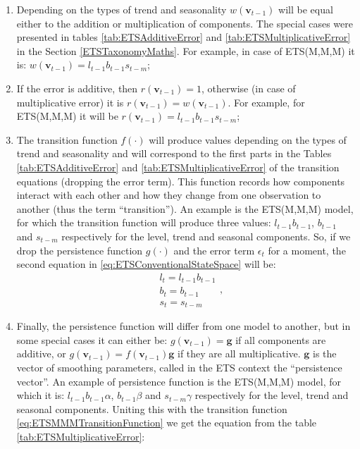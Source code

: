 \documentclass[]{book}
\providecommand{\tightlist}{%
  \setlength{\itemsep}{0pt}\setlength{\parskip}{0pt}}
\theoremstyle{definition}
\theoremstyle{definition}
\theoremstyle{definition}
\theoremstyle{definition}
\theoremstyle{remark}
\begin{document}
\begin{enumerate}
\def\labelenumi{\arabic{enumi}.}
\tightlist
\item
  Depending on the types of trend and seasonality \(w(\mathbf{v}_{t-1})\) will be equal either to the addition or multiplication of components. The special cases were presented in tables \ref{tab:ETSAdditiveError} and \ref{tab:ETSMultiplicativeError} in the Section \ref{ETSTaxonomyMaths}. For example, in case of ETS(M,M,M) it is: \(w(\mathbf{v}_{t-1}) = l_{t-1} b_{t-1} s_{t-m}\);
\item
  If the error is additive, then \(r(\mathbf{v}_{t-1})=1\), otherwise (in case of multiplicative error) it is \(r(\mathbf{v}_{t-1})=w(\mathbf{v}_{t-1})\). For example, for ETS(M,M,M) it will be \(r(\mathbf{v}_{t-1}) = l_{t-1} b_{t-1} s_{t-m}\);
\item
  The transition function \(f(\cdot)\) will produce values depending on the types of trend and seasonality and will correspond to the first parts in the Tables \ref{tab:ETSAdditiveError} and \ref{tab:ETSMultiplicativeError} of the transition equations (dropping the error term). This function records how components interact with each other and how they change from one observation to another (thus the term ``transition''). An example is the ETS(M,M,M) model, for which the transition function will produce three values: \(l_{t-1}b_{t-1}\), \(b_{t-1}\) and \(s_{t-m}\) respectively for the level, trend and seasonal components. So, if we drop the persistence function \(g(\cdot)\) and the error term \(\epsilon_t\) for a moment, the second equation in \eqref{eq:ETSConventionalStateSpace} will be:
  \begin{equation}
    \begin{aligned}
    & {l}_{t} = l_{t-1} b_{t-1} \\
    & b_t = b_{t-1} \\
    & s_t = s_{t-m}
    \end{aligned},
    \label{eq:ETSMMMTransitionFunction}
  \end{equation}
\item
  Finally, the persistence function will differ from one model to another, but in some special cases it can either be: \(g(\mathbf{v}_{t-1})=\mathbf{g}\) if all components are additive, or \(g(\mathbf{v}_{t-1})=f(\mathbf{v}_{t-1})\mathbf{g}\) if they are all multiplicative. \(\mathbf{g}\) is the vector of smoothing parameters, called in the ETS context the ``persistence vector''. An example of persistence function is the ETS(M,M,M) model, for which it is: \(l_{t-1}b_{t-1}\alpha\), \(b_{t-1}\beta\) and \(s_{t-m}\gamma\) respectively for the level, trend and seasonal components. Uniting this with the transition function \eqref{eq:ETSMMMTransitionFunction} we get the equation from the table \ref{tab:ETSMultiplicativeError}:

\end{enumerate}
\end{document}
